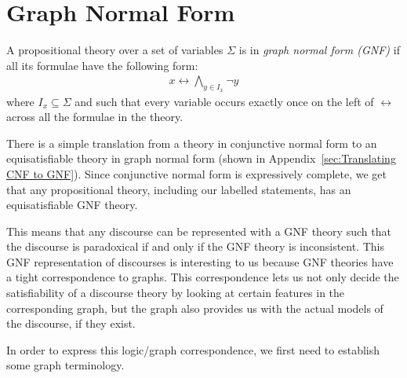 
\section{Graph Normal Form}
\label{sec:Graph Normal Form}
A propositional theory over a set of variables $\Sigma$ is in \textit{graph normal form (GNF)}\cite{apal-digraph} if all its formulae have the following form:
\begin{align}
  x \leftrightarrow \bigwedge_{y \in I_x} \neg y
\end{align}
where $I_x \subseteq \Sigma$ and such that every variable occurs exactly once on the left of $\leftrightarrow$ across all the formulae in the theory.

There is a simple translation from a theory in conjunctive normal form to an equisatisfiable theory in graph normal form (shown in Appendix~\ref{sec:Translating CNF to GNF}).
Since conjunctive normal form is expressively complete, we get that any propositional theory, including our labelled statements, has an equisatisfiable GNF theory.

This means that any discourse can be represented with a GNF theory such that the discourse is paradoxical if and only if the GNF theory is inconsistent.
This GNF representation of discourses is interesting to us because GNF theories have a tight correspondence to graphs.
This correspondence lets us not only decide the satisfiability of a discourse theory by looking at certain features in the corresponding graph, but the graph also provides us with the actual models of the discourse, if they exist.

In order to express this logic/graph correspondence, we first need to establish some graph terminology.
